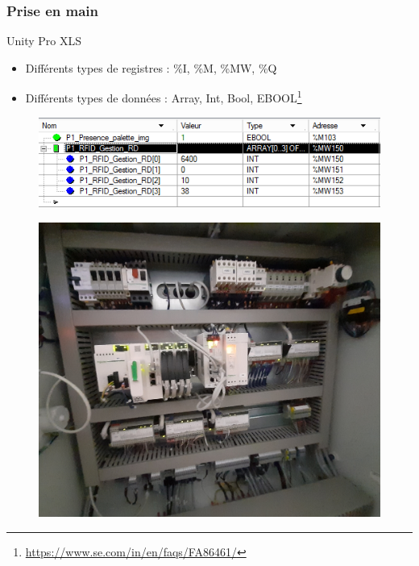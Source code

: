 \documentclass[12pt]{beamer}
\begin{document}
	\begin{frame}[allowframebreaks]
	\frametitle{Prise en main}
		\begin{block}{Unity Pro XLS}
				\begin{itemize}
					[square]
					\item Différents types de registres : \%I, \%M, \%MW, \%Q
					\item Différents types de données : Array, Int, Bool, EBOOL\footnote{\url{https://www.se.com/in/en/faqs/FA86461/}}
				\end{itemize}
		\end{block}
		
		\begin{figure}[H]
			\centering
			\includegraphics[scale=0.5]{unity.png}
			\label{fig:unity}
		\end{figure}
		
		\begin{figure}[H]
			\centering
			\includegraphics[scale=0.28]{automate.jpg}
			\label{fig:automate}
		\end{figure}
	\end{frame}
	
\end{document}
